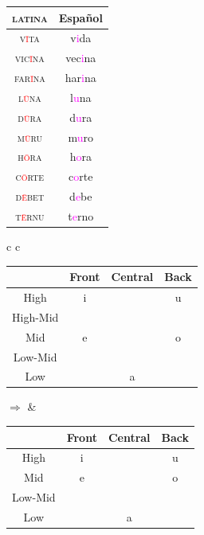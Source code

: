 \documentclass{report}[12pt]
\begin{document}
\begin{tabular}{c c}
  \textsc{latina} & Español \\
  \hline
  \textsc{v\textcolor{red}{\={i}}ta} & v\textcolor{magenta}{i}da \\
  \textsc{vic\textcolor{red}{\={i}}na} & vec\textcolor{magenta}{i}na \\
  \textsc{far\textcolor{red}{\={i}}na} & har\textcolor{magenta}{i}na \\
  \textsc{l\textcolor{red}{\={u}}na} & l\textcolor{magenta}{u}na \\
  \textsc{d\textcolor{red}{\={u}}ra} & d\textcolor{magenta}{u}ra \\
  \textsc{m\textcolor{red}{\={u}}ru} & m\textcolor{magenta}{u}ro \\
  \textsc{h\textcolor{red}{\={o}}ra} & h\textcolor{magenta}{o}ra \\
  \textsc{c\textcolor{red}{\={o}}rte} & c\textcolor{magenta}{o}rte \\
  \textsc{d\textcolor{red}{\={e}}bet} & d\textcolor{magenta}{e}be \\
  \textsc{t\textcolor{red}{\={e}}rnu} & t\textcolor{magenta}{e}rno \\
\end{tabular}

\begin{tcolorbox}[title=Great Merger, hbox]
  \begin{tabular}{c c}
    \begin{tabular}{|c|c|c|c|}
      \hline
      & Front & Central & Back \\
      \hline
      High & i & & u \\
      \hline
      High-Mid & \cellcolor{gray} \textipa{I} & & \cellcolor{gray} \textipa{U} \\
      \hline
      Mid & e & & o \\
      \hline
      Low-Mid & \textipa{E} & & \textipa{O} \\
      \hline
      Low & & a & \\
      \hline
    \end{tabular}
    \quad $\Rightarrow$ &
                          \begin{tabular}{|c|c|c|c|}
                            \hline
                            & Front & Central & Back \\
                            \hline
                            High & i & & u \\
                            \hline
                            Mid & \cellcolor{magenta} e & & \cellcolor{magenta} o \\
                            \hline
                            Low-Mid & \textipa{E} & & \textipa{O} \\
                            \hline
                            Low & & a & \\
                            \hline
                          \end{tabular}
  \end{tabular}
\end{tcolorbox}
\end{document}
